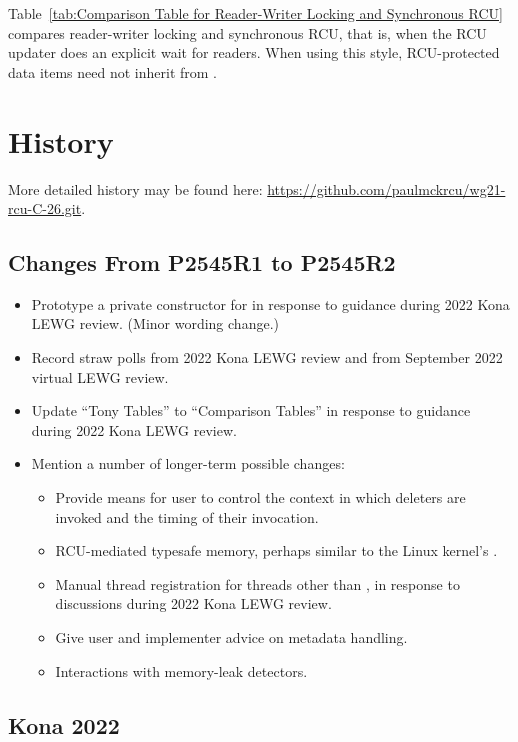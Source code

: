 Table~\ref{tab:Comparison Table for Reader-Writer Locking and Synchronous RCU}
compares reader-writer locking and synchronous RCU, that is, when the
RCU updater does an explicit wait for readers.
When using this style, RCU-protected data items need not inherit from
.

\section{History}
\label{sec:History}

More detailed history may be found here:
\url{https://github.com/paulmckrcu/wg21-rcu-C-26.git}.

\subsection{Changes From P2545R1 to P2545R2}
\label{sec:Changes From P2545R1 to P2545R2}

\begin{itemize}
\item	Prototype a private constructor for  in response
	to guidance during 2022 Kona LEWG review.
	(Minor wording change.)
\item	Record straw polls from 2022 Kona LEWG review and from
	September 2022 virtual LEWG review.
\item	Update ``Tony Tables'' to ``Comparison Tables'' in response to
	guidance during 2022 Kona LEWG review.
\item	Mention a number of longer-term possible changes:
	\begin{itemize}
	\item	Provide means for user to control the context in
		which deleters are invoked and the timing of their
		invocation.
	\item	RCU-mediated typesafe memory, perhaps similar to the
		Linux kernel's .
	\item	Manual thread registration for threads other than
		, in response to discussions during
		2022 Kona LEWG review.
	\item	Give user and implementer advice on 
		metadata handling.
	\item	Interactions with memory-leak detectors.
	\end{itemize}
\end{itemize}

\subsection{Kona 2022}
\label{sec:Kona 2022}

